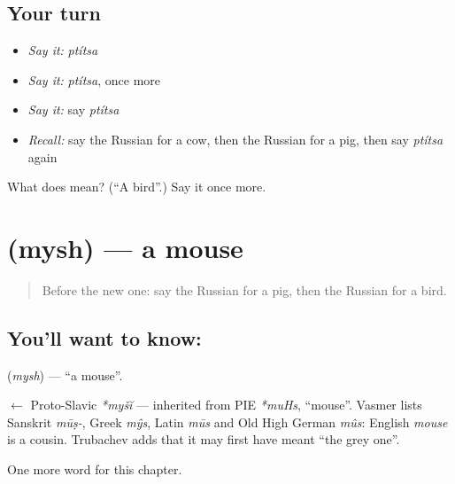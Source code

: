 \subsection*{Your turn}
\begin{itemize}
\raggedright
  \item \emph{Say it:} \emph{ptítsa}
  \item \emph{Say it:} \emph{ptítsa}, once more
  \item \emph{Say it:} say \emph{ptítsa}
  \item \emph{Recall:} say the Russian for a cow, then the Russian for a pig, then say \emph{ptítsa} again
\end{itemize}

\begin{tcolorbox}[breakable,colback=teal!4,colframe=teal!35!black,title={Before you move on}]
What does  mean? (\textquotedblleft{}A bird\textquotedblright{}.) Say it once more.
\end{tcolorbox}
\section[\texorpdfstring{\ru{мышь} (mysh)}{мышь (mysh)}]{ (mysh) — a mouse}

\label{lesson:RU-C61-mouse}



\begin{quote}
Before the new one: say the Russian for a pig, then the Russian for a bird.
\end{quote}

\subsection*{You'll want to know: }
\textbf{} (\emph{mysh}) — \textquotedblleft{}a mouse\textquotedblright{}.

\begin{cousinweb}
\textbf{} $\leftarrow$ Proto-Slavic \emph{*myšĭ} — inherited from PIE \emph{*muHs}, \textquotedblleft{}mouse\textquotedblright{}. Vasmer lists Sanskrit \emph{mūṣ-}, Greek \emph{mŷs}, Latin \emph{mūs} and Old High German \emph{mûs}: English \emph{mouse} is a cousin. Trubachev adds that it may first have meant \textquotedblleft{}the grey one\textquotedblright{}.
\end{cousinweb}

\begin{grammarlens}[title={What you've built}]
One more word for this chapter.
\end{grammarlens}

